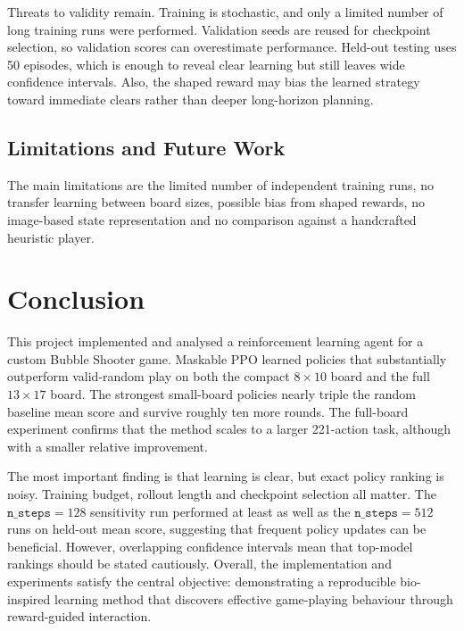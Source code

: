 \documentclass[10pt,a4paper]{article}
\begin{document}
Threats to validity remain. Training is stochastic, and only a limited number of long training runs were performed. Validation seeds are reused for checkpoint selection, so validation scores can overestimate performance. Held-out testing uses 50 episodes, which is enough to reveal clear learning but still leaves wide confidence intervals. Also, the shaped reward may bias the learned strategy toward immediate clears rather than deeper long-horizon planning.

\subsection*{Limitations and Future Work}

The main limitations are the limited number of independent training runs, no transfer learning between board sizes, possible bias from shaped rewards, no image-based state representation and no comparison against a handcrafted heuristic player.

\section{Conclusion}

This project implemented and analysed a reinforcement learning agent for a custom Bubble Shooter game. Maskable PPO learned policies that substantially outperform valid-random play on both the compact \(8\times10\) board and the full \(13\times17\) board. The strongest small-board policies nearly triple the random baseline mean score and survive roughly ten more rounds. The full-board experiment confirms that the method scales to a larger 221-action task, although with a smaller relative improvement.

The most important finding is that learning is clear, but exact policy ranking is noisy. Training budget, rollout length and checkpoint selection all matter. The \(\texttt{n\_steps}=128\) sensitivity run performed at least as well as the \(\texttt{n\_steps}=512\) runs on held-out mean score, suggesting that frequent policy updates can be beneficial. However, overlapping confidence intervals mean that top-model rankings should be stated cautiously. Overall, the implementation and experiments satisfy the central objective: demonstrating a reproducible bio-inspired learning method that discovers effective game-playing behaviour through reward-guided interaction.
\end{document}
